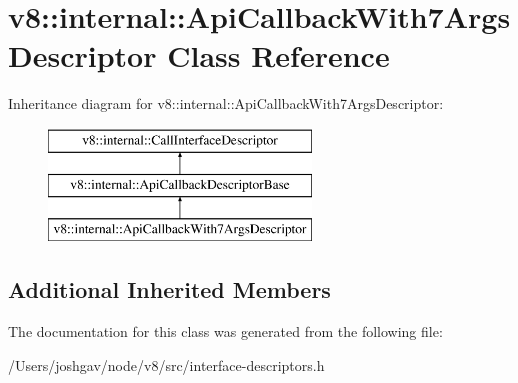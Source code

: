 \hypertarget{classv8_1_1internal_1_1_api_callback_with7_args_descriptor}{}\section{v8\+:\+:internal\+:\+:Api\+Callback\+With7\+Args\+Descriptor Class Reference}
\label{classv8_1_1internal_1_1_api_callback_with7_args_descriptor}
Inheritance diagram for v8\+:\+:internal\+:\+:Api\+Callback\+With7\+Args\+Descriptor\+:\begin{figure}[H]
\begin{center}
\leavevmode
\includegraphics[height=3.000000cm]{classv8_1_1internal_1_1_api_callback_with7_args_descriptor}
\end{center}
\end{figure}
\subsection*{Additional Inherited Members}


The documentation for this class was generated from the following file\+:\begin{DoxyCompactItemize}
\item 
/\+Users/joshgav/node/v8/src/interface-\/descriptors.\+h\end{DoxyCompactItemize}
